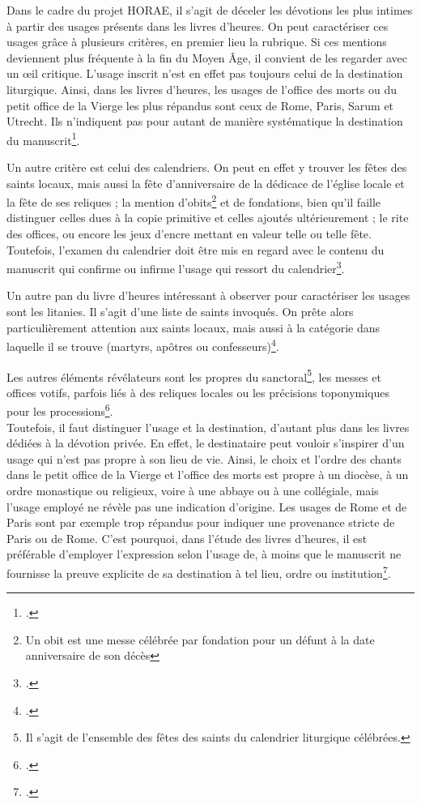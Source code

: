 \documentclass[a4paper,12pt,twoside]{book}
\begin{document}
	Dans le cadre du projet HORAE, il s'agit de déceler les dévotions les plus intimes à partir des usages présents dans les livres d'heures. On peut caractériser ces usages grâce à plusieurs critères, en premier lieu la rubrique. Si ces mentions deviennent plus fréquente à la fin du Moyen Âge, il convient de les regarder avec un œil critique. L'usage inscrit n'est en effet pas toujours celui de la destination liturgique. Ainsi, dans les livres d’heures, les usages de l’office des morts ou du petit office de la Vierge les plus répandus sont ceux de Rome, Paris, Sarum et Utrecht. Ils n'indiquent pas pour autant de manière systématique la destination du manuscrit\footcite{usages_lit}. 
	
	Un autre critère est celui des calendriers. On peut en effet y trouver les fêtes des saints locaux, mais aussi la fête d'anniversaire de la dédicace de l'église locale et la fête de ses reliques ; la mention d'obits\footnote{Un obit est une messe célébrée par fondation pour un défunt à la date anniversaire de son décès} et de fondations, bien qu'il faille distinguer  celles dues à la copie primitive et celles ajoutés ultérieurement ; le rite des offices, ou encore les jeux d'encre mettant en valeur telle ou telle fête. Toutefois, l'examen du calendrier doit être mis en regard avec le contenu du manuscrit qui confirme ou infirme l'usage qui ressort du calendrier\footcite{usages_lit}.
	
	Un autre pan du livre d'heures intéressant à observer pour caractériser les usages sont les litanies. Il s'agit d'une liste de saints invoqués. On prête alors particulièrement attention aux saints locaux, mais aussi à la catégorie dans laquelle il se trouve (martyrs, apôtres ou confesseurs)\footcite{usages_lit}. 
	
	Les autres éléments révélateurs sont les propres du sanctoral\footnote{Il s'agit de l'ensemble des fêtes des saints du calendrier liturgique célébrées.}, les messes et offices votifs, parfois liés à des reliques locales ou les précisions toponymiques pour les processions\footcite{usages_lit}. \\
	
	Toutefois, il faut distinguer l'usage et la destination, d'autant plus dans les livres dédiées à la dévotion privée. En effet, le destinataire peut vouloir s'inspirer d'un usage qui n'est pas propre à son lieu de vie. Ainsi, le choix et l'ordre des chants dans le petit office de la Vierge et l'office des morts est propre à un diocèse, à un ordre monastique ou religieux, voire à une abbaye ou à une collégiale, mais l'usage employé ne révèle pas une indication d'origine. Les usages de Rome et de Paris sont par exemple trop répandus pour indiquer une provenance stricte de Paris ou de Rome. C'est pourquoi, dans l'étude des livres d'heures, il est préférable d'employer l'expression \og selon l'usage de\fg{}, à moins que le manuscrit ne fournisse la preuve explicite de sa destination à tel lieu, ordre ou institution\footcite[p. 5]{initiation_man_lit}.\\
	
\end{document}
